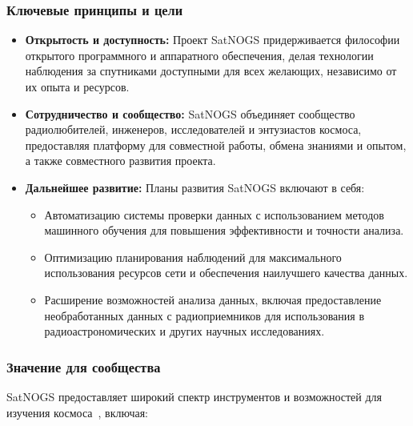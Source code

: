 \documentclass[14pt, a4paper]{../cls/coursework}
\begin{document}
    \subsubsection{Ключевые принципы и цели}

    \begin{itemize}
        \item \textbf{Открытость и доступность:} Проект SatNOGS придерживается философии открытого программного и аппаратного обеспечения, делая технологии наблюдения за спутниками доступными для всех желающих, независимо от их опыта и ресурсов.
        \item \textbf{Сотрудничество и сообщество:} SatNOGS объединяет сообщество радиолюбителей, инженеров, исследователей и энтузиастов космоса, предоставляя платформу для совместной работы, обмена знаниями и опытом,  а также совместного развития проекта.
        \item \textbf{Дальнейшее развитие:} Планы развития SatNOGS включают в себя:
        \begin{itemize}
            \item Автоматизацию системы проверки данных с использованием методов машинного обучения для повышения эффективности и точности анализа.
            \item Оптимизацию планирования наблюдений для максимального использования ресурсов сети и обеспечения наилучшего качества данных.
            \item Расширение возможностей анализа данных, включая предоставление необработанных данных с радиоприемников для использования в радиоастрономических и других научных исследованиях.
        \end{itemize}
    \end{itemize}

    \subsubsection{Значение для сообщества}

    SatNOGS предоставляет широкий спектр инструментов и возможностей для изучения космоса~\cite{satnogs_general_docs},  включая:
\end{document}
